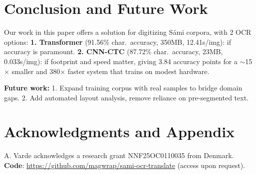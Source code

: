 \documentclass[runningheads]{llncs}
\newcommand{\ctcCacc}{87.72}
\newcommand{\trocrBestCacc}{91.56}
\newcommand{\modelSize}{23MB}
\newcommand{\trocrSize}{350MB}
\newcommand{\trocrBestTime}{12.41}
\newcommand{\ctcTime}{0.033}
\newcommand{\speedupFactor}{380}
\newcommand{\sizeRatio}{15}
\newcommand{\cerAccGap}{3.84}
\begin{document}
\vspace{-0.5cm}
\section{Conclusion and Future Work}
\vspace{-0.2cm}
Our work in this paper offers a solution for digitizing S\'{a}mi corpora, with 2 OCR options:
{\bf 1. Transformer} (\trocrBestCacc\% char.\ accuracy, \trocrSize{}, \trocrBestTime{}s/img): if accuracy is paramount.
{\bf 2. CNN-CTC} (\ctcCacc\% char.\ accuracy, \modelSize{}, \ctcTime{}s/img): if footprint and speed matter, giving \cerAccGap{} accuracy points for a $\sim$\sizeRatio$\times$ smaller and \speedupFactor$\times$ faster system that trains on modest hardware.

\textbf{Future work:}
    1. Expand training corpus with real samples to bridge domain gaps. %
    2. Add automated layout analysis, remove reliance on pre-segmented text.



\section*{Acknowledgments and Appendix}
A. Varde acknowledges a research grant NNF25OC0110035 from Denmark. \\

\noindent \textbf{Code}: \url{https://github.com/magwrap/sami-ocr-translate} (access upon request).
\end{document}
